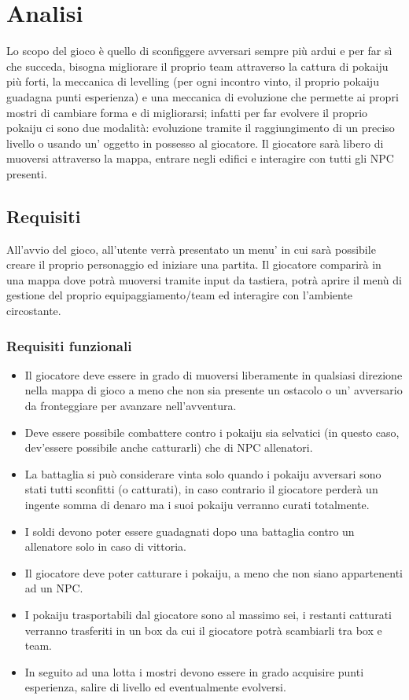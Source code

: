 \chapter{Analisi}

Lo scopo del gioco è quello di sconfiggere avversari sempre più ardui e per far sì che succeda, bisogna migliorare il proprio team attraverso la cattura di pokaiju più forti, la meccanica di levelling (per ogni incontro vinto, il proprio pokaiju guadagna punti esperienza) e una meccanica di evoluzione che permette ai propri mostri di cambiare forma e di migliorarsi; infatti per far evolvere il proprio pokaiju ci sono due modalità: evoluzione tramite il raggiungimento di un preciso livello o usando un' oggetto in possesso al giocatore. Il giocatore sarà libero di muoversi attraverso la mappa, entrare negli edifici e interagire con tutti gli NPC presenti.

\section{Requisiti}
    All'avvio del gioco, all'utente verrà presentato un menu' in cui sarà possibile creare il proprio personaggio ed iniziare una partita.
    Il giocatore comparirà in una mappa dove potrà muoversi tramite input da tastiera, potrà aprire il menù di gestione del proprio equipaggiamento/team ed interagire con l'ambiente circostante.

\subsection*{Requisiti funzionali}
\begin{itemize}
	\item Il giocatore deve essere in grado di muoversi liberamente in qualsiasi direzione nella mappa di gioco a meno che non sia presente un ostacolo o un' avversario da fronteggiare per avanzare nell'avventura.
	\item Deve essere possibile combattere contro i pokaiju sia selvatici (in questo caso, dev'essere possibile anche catturarli) che di NPC allenatori.
	\item La battaglia si può considerare vinta solo quando i pokaiju avversari sono stati tutti sconfitti (o catturati), in caso contrario il giocatore perderà un ingente somma di denaro ma i suoi pokaiju verranno curati totalmente.
	\item I soldi devono poter essere guadagnati dopo una battaglia contro un allenatore solo in caso di vittoria.
	\item Il giocatore deve poter catturare i pokaiju, a meno che non siano appartenenti ad un NPC. 
	\item I pokaiju trasportabili dal giocatore sono al massimo sei, i restanti catturati verranno trasferiti in un box da cui il giocatore potrà scambiarli tra box e team.
	\item In seguito ad una lotta i mostri devono essere in grado acquisire punti esperienza, salire di livello ed eventualmente evolversi.
\end{itemize}

